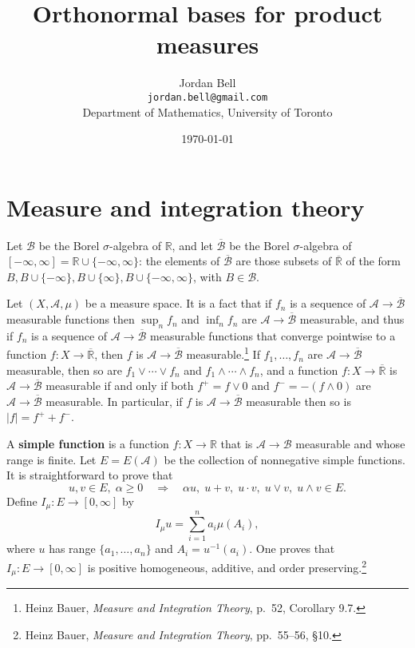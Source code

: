 \documentclass{article}
\theoremstyle{definition}
\begin{document}
\title{Orthonormal bases for product measures}
\author{Jordan Bell\\ \texttt{jordan.bell@gmail.com}\\Department of Mathematics, University of Toronto}
\date{\today}

\maketitle

\section{Measure and integration theory}
Let $\mathscr{B}$ be the Borel $\sigma$-algebra of $\mathbb{R}$, and let
$\overline{\mathscr{B}}$ be the Borel $\sigma$-algebra of $[-\infty,\infty]=\mathbb{R} \cup \{-\infty,\infty\}$:
the elements of $\overline{\mathscr{B}}$ are those subsets of $\overline{\mathbb{R}}$ of
the form
$B,B \cup \{-\infty\},B \cup \{\infty\}, B \cup \{-\infty,\infty\}$, with $B \in \mathscr{B}$. 

Let $(X,\mathscr{A},\mu)$ be a measure space.
It is a fact that if $f_n$ is a sequence of $\mathscr{A} \to \overline{\mathscr{B}}$ measurable functions then
$\sup_n f_n$ and $\inf_n f_n$ are $\mathscr{A} \to \overline{\mathscr{B}}$ measurable, and thus  if
$f_n$ is a sequence of $\mathscr{A} \to \overline{\mathscr{B}}$ measurable functions
that converge pointwise to a function $f:X \to \overline{\mathbb{R}}$, then
$f$ is $\mathscr{A}\to \overline{\mathscr{B}}$ measurable.\footnote{Heinz Bauer,
{\em Measure and Integration Theory}, p.~52, Corollary 9.7.} If $f_1,\ldots,f_n$ are $\mathscr{A} \to \overline{\mathscr{B}}$ measurable,
then so are $f_1 \vee \cdots \vee  f_n$ and $f_1 \wedge \cdots \wedge f_n$, and
a function $f:X \to \overline{\mathbb{R}}$ is $\mathscr{A} \to \overline{\mathscr{B}}$ measurable
if and only if both
$f^+=f \vee 0$ and $f^-=-(f \wedge 0)$ are $\mathscr{A} \to \overline{\mathscr{B}}$ measurable. In particular,
if $f$ is $\mathscr{A} \to \overline{\mathscr{B}}$ measurable then so is $|f|=f^++f^-$. 

A \textbf{simple function} is a function $f:X \to \mathbb{R}$ that is 
$\mathscr{A} \to \mathscr{B}$ measurable and whose range is finite. 
Let $E=E(\mathscr{A})$ be the collection of nonnegative simple functions. It is straightforward to prove that
\[
u,v \in E,\; \alpha \geq 0\quad \Rightarrow \quad \alpha u, \; u+v, \; u\cdot v, \; u\vee v, \; u\wedge v \in E.
\]
Define $I_\mu:E \to [0,\infty]$ by
\[
I_\mu u =  \sum_{i=1}^n a_i \mu(A_i),
\]
where $u$ has
 range $\{a_1,\ldots,a_n\}$ and 
$A_i = u^{-1}(a_i)$.
One proves that $I_\mu:E \to [0,\infty]$ is positive homogeneous, additive, and order preserving.\footnote{Heinz Bauer,
{\em Measure and Integration Theory}, pp.~55--56, \S 10.} 
\end{document}

